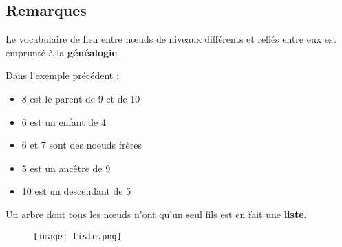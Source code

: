 \documentclass[french]{article}
\theoremstyle{plain}
\begin{document}
\subsection{Remarques}

Le vocabulaire de lien entre nœuds de niveaux différents et reliés entre eux est emprunté à la \textbf{généalogie}.

Dans l'exemple précédent :

\begin{itemize}[label=$\triangleright$]
	\item 8 est le parent de 9 et de 10
	\item 6 est un enfant de 4
	\item 6 et 7 sont des noeuds frères
	\item 5 est un ancêtre de 9
	\item 10 est un descendant de 5
\end{itemize}

Un arbre dont tous les nœuds n'ont qu'un seul fils est en fait une \textbf{liste}.

\begin{figure}[h]  %
	\centering
	\texttt{[image: liste.png]}
\end{figure}
\end{document}
